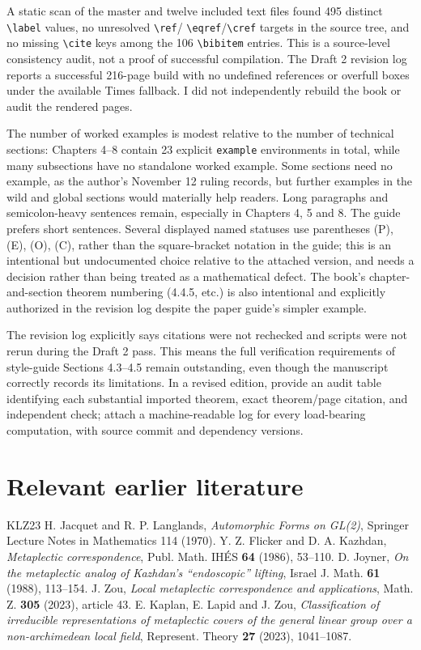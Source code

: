 \documentclass[12pt,letterpaper]{article}
\begin{document}
A static scan of the master and twelve included text files found
495 distinct \verb|\label| values, no unresolved \verb|\ref|/
\verb|\eqref|/\verb|\cref| targets in the source tree, and no missing
\verb|\cite| keys among the 106 \verb|\bibitem| entries. This is a
source-level consistency audit, not a proof of successful compilation.
The Draft 2 revision log reports a successful 216-page build with no
undefined references or overfull boxes under the available Times
fallback. I did not independently rebuild the book or audit the
rendered pages.

The number of worked examples is modest relative to the number of
technical sections: Chapters 4--8 contain 23 explicit
\verb|example| environments in total, while many subsections have no
standalone worked example. Some sections need no example, as the author's
November 12 ruling records, but further examples in the wild and global
sections would materially help readers. Long paragraphs and semicolon-heavy
sentences remain, especially in Chapters 4, 5 and 8. The guide prefers
short sentences. Several displayed named statuses use parentheses
(P), (E), (O), (C), rather than the square-bracket notation in the
guide; this is an intentional but undocumented choice relative to the
attached version, and needs a decision rather than being treated as a
mathematical defect. The book's chapter-and-section theorem numbering
(4.4.5, etc.) is also intentional and explicitly authorized in the
revision log despite the paper guide's simpler example.

The revision log explicitly says citations were not rechecked and scripts
were not rerun during the Draft 2 pass. This means the full verification
requirements of style-guide Sections 4.3--4.5 remain outstanding, even
though the manuscript correctly records its limitations. In a revised
edition, provide an audit table identifying each substantial imported
theorem, exact theorem/page citation, and independent check; attach a
machine-readable log for every load-bearing computation, with source
commit and dependency versions.

\section{Relevant earlier literature}
\begin{thebibliography}{KLZ23}
 H. Jacquet and R. P. Langlands,
\emph{Automorphic Forms on GL(2)}, Springer Lecture Notes in Mathematics 114 (1970).
 Y. Z. Flicker and D. A. Kazhdan,
\emph{Metaplectic correspondence}, Publ. Math. IH\'ES \textbf{64} (1986), 53--110.
 D. Joyner,
\emph{On the metaplectic analog of Kazhdan's ``endoscopic'' lifting},
Israel J. Math. \textbf{61} (1988), 113--154.
 J. Zou,
\emph{Local metaplectic correspondence and applications},
Math. Z. \textbf{305} (2023), article 43.
 E. Kaplan, E. Lapid and J. Zou,
\emph{Classification of irreducible representations of metaplectic
covers of the general linear group over a non-archimedean local field},
Represent. Theory \textbf{27} (2023), 1041--1087.
\end{thebibliography}
\end{document}
